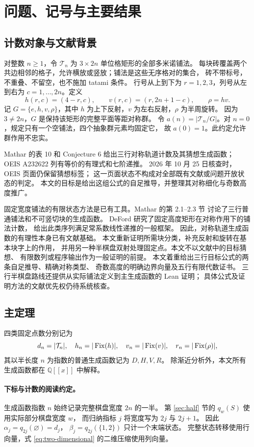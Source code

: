 \section{问题、记号与主要结果}
\label{sec:intro}

\subsection{计数对象与文献背景}
对整数 $n\ge1$，令 $\mathcal T_n$ 为 $3\times2n$ 单位格矩形的全部多米诺铺法。
每块砖覆盖两个共边相邻的格子，允许横放或竖放；铺法是这些无序格对的集合，
砖不带标号，不重叠、不留空，也不施加 tatami 条件。
行号从上到下为 $r=1,2,3$，列号从左到右为 $c=1,\ldots,2n$。定义
\[
 h(r,c)=(4-r,c),\qquad v(r,c)=(r,2n+1-c),\qquad \rho=hv.
\]
记 $G=\{e,h,v,\rho\}$，其中 $h$ 为上下反射，$v$ 为左右反射，$\rho$ 为半周旋转。
因为 $3\ne2n$，$G$ 是保持该矩形的完整平面等距对称群。
令 $a(n)=|\mathcal T_n/G|$。对 $n=0$，规定只有一个空铺法，四个抽象群元素均固定它，
故 $a(0)=1$。此约定允许群作用不忠实。

Mathar \cite{mathar2013} 的表 10 和 Conjecture 6 给出三行对称轨道计数及其猜想生成函数；
OEIS A232622 \cite{oeis} 列有等价的有理式和七阶递推。
2026 年 10 月 25 日核查时，OEIS 页面仍保留猜想标签；
这一页面状态不构成对全部既有文献或问题开放状态的判定。
本文的目标是给出这组公式的自足推导，并整理其对称细化与奇数高度推广。

固定宽度铺法的有限状态方法是已有工具。Mathar \cite{mathar2014} 的第 2.1--2.3 节
讨论了三行普通铺法和不可竖切块的生成函数。
DeFord \cite[定理 6.1]{deford} 研究了固定高度矩形在对称作用下的铺法计数，
给出此类序列满足常系数线性递推的一般框架。
因此，对称轨道生成函数的有理性本身已有文献基础。
本文重新证明所需块分类，补充反射和旋转在基本块字上的作用，
并用另一种半棋盘双射处理固定点。本文不以文献中的目标猜想、
有限数列或程序输出作为一般证明的前提。
本文着重给出三行目标公式的两条自足推导、精确对称类型、
奇数高度的明确边界向量及五行有限代数证书。
三行半棋盘路线还提供从实际铺法定义到主生成函数的 Lean 证明；
具体公式及证明方法的文献优先权仍待系统核查。

\subsection{主定理}
四类固定点数分别记为
\[
 d_n=|\mathcal T_n|,\quad h_n=|\operatorname{Fix}(h)|,\quad
 v_n=|\operatorname{Fix}(v)|,\quad r_n=|\operatorname{Fix}(\rho)|,
\]
其以半长度 $n$ 为指数的普通生成函数记为 $D,H,V,R$。
除渐近分析外，本文所有生成函数都在 $\mathbb Q[[x]]$ 中解释。

\paragraph{下标与计数的阅读约定。}
生成函数指数 $n$ 始终记录完整棋盘宽度 $2n$ 的一半。
第 \ref{sec:half} 节的 $q_w(S)$ 使用实际部分棋盘宽度 $w$，
而归纳指标 $j$ 将宽度写为 $2j$ 与 $2j+1$。
因此 $\alpha_j=q_{2j}(\varnothing)=d_j$，
$\beta_j=q_{2j}(\{1,2\})$ 只计一个末端状态。
完整状态转移使用行向量，式 \eqref{eq:two-dimensional} 的二维压缩使用列向量。

